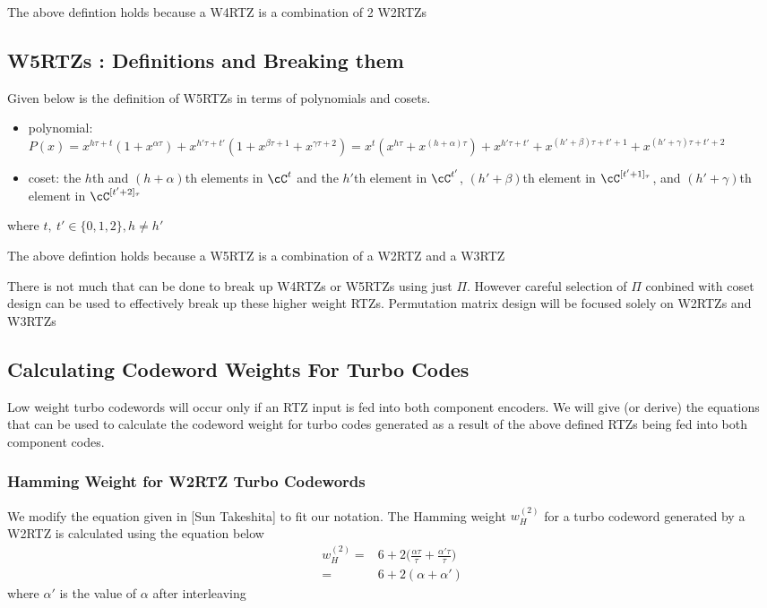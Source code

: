 The above defintion holds because a W4RTZ is a combination of 2 W2RTZs

\subsection{W5RTZs : Definitions and Breaking them}
Given below is the definition of W5RTZs in terms of polynomials and cosets.
\begin{itemize}
	\item polynomial: $P(x)=x^{h\tau+t}(1+x^{\alpha \tau}) 
	+
	x^{h'\tau+t'}(1+x^{\beta \tau +1}+x^{\gamma \tau +2})= 
	x^t(x^{h\tau}+x^{(h+\alpha)\tau}) 
	+x^{h'\tau+t'}+x^{(h'+\beta) \tau +t'+1}+x^{(h'+\gamma) \tau +t'+2}
	$
	\item coset: the $h$th and $(h+\alpha)$th elements in $\cC^t$ and  the 
	$h'$th element in $\cC^{t'}$, $(h'+\beta)$th element in $\cC^{[t'+1]_\tau}$, and $(h'+\gamma)$th element in $\cC^{[t'+2]_\tau}$
\end{itemize}
where $t,~t' \in\{0,1,2\},h \neq h'$

The above defintion holds because a W5RTZ is a combination of a W2RTZ and a W3RTZ

There is not much that can be done to break up W4RTZs or W5RTZs using just $\Pi$. However careful selection of $\Pi$ conbined with coset design can be used to effectively break up these higher weight RTZs. Permutation matrix design will be focused solely on W2RTZs and W3RTZs

\subsection{Calculating Codeword Weights For Turbo Codes}
Low weight turbo codewords will occur only if an RTZ input is fed into both component encoders. We will give (or derive) the equations that can be used to calculate the codeword weight for turbo codes generated as a result of the above defined RTZs being fed into both component codes.

\subsubsection{Hamming Weight for W2RTZ Turbo Codewords }
We modify the equation given in [Sun Takeshita] to fit our notation. The Hamming weight $w^{(2)}_H$ for a turbo codeword generated by a W2RTZ is calculated using the equation below 
\begin{equation}
\begin{split}
w^{(2)}_H=&6+2\Big(\frac{\alpha \tau}{\tau}+\frac{\alpha'\tau}{\tau}\Big)\\
=& 6 +2(\alpha + \alpha')
\end{split}
\label{RTZinputs-1}
\end{equation}
where $\alpha'$ is the value of $\alpha$ after interleaving

